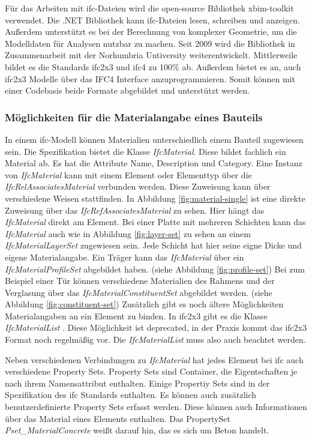 Für das Arbeiten mit \ac{ifc}-Dateien wird die open-source Bibliothek xbim-toolkit verwendet. Die .NET Bibliothek kann \ac{ifc}-Dateien lesen, schreiben und anzeigen. Außerdem unterstützt es bei der Berechnung von komplexer Geometrie, um die Modelldaten für Analysen nutzbar zu machen. Seit 2009 wird die Bibliothek in Zusammenarbeit mit der Norhumbria Untiversity weiterentwickelt. Mittlerweile bildet es die Standards \ac{ifc2x3} und \ac{ifc4} zu 100\% ab. Außerdem bietet es an, auch \ac{ifc2x3} Modelle über das IFC4 Interface anzuprogrammieren. Somit können mit einer Codebasis beide Formate abgebildet und unterstützt werden. \citep{Xbim_ltd_undated-wm}


\subsubsection{Möglichkeiten für die  Materialangabe eines Bauteils}
\label{s:basics:ifc:buildingmaterial}
In einem \ac{ifc}-Modell können Materialien unterschiedlich einem Bauteil zugewiesen sein. Die Spezifikation bietet die Klasse \textit{IfcMaterial}. Diese bildet fachlich ein Material ab. Es hat die Attribute Name, Description und Category.\citep{ifc_material} Eine Instanz von \textit{IfcMaterial} kann mit einem Element oder Elementtyp über die \textit{IfcRelAssociatesMaterial} verbunden werden. Diese Zuweisung kann über verschiedene Weisen stattfinden. In Abbildung \ref{fig:material-single} ist eine direkte Zuweisung über das \textit{IfcRefAssociatesMaterial} zu sehen. Hier hängt das \textit{IfcMaterial} direkt am Element. 
Bei einer Platte mit mehreren Schichten kann das \textit{IfcMaterial} auch wie in Abbildung \ref{fig:layer-set} zu sehen an einem \textit{IfcMaterialLayerSet} zugewiesen sein. Jede Schicht hat hier seine eigne Dicke und eigene Materialangabe. 
Ein Träger kann das \textit{IfcMaterial} über ein \textit{IfcMaterialProfileSet} abgebildet haben. (siehe Abbildung \ref{fig:profile-set})
Bei zum Beispiel einer Tür können verschiedene Materialien des Rahmens und der Verglasung über das \textit{IfcMaterialConstituentSet} abgebildet werden. (siehe Abbildung \ref{fig:constituent-set}) \citep{ifc_material_association}
Zusätzlich gibt es noch ältere Möglichkeiten Materialangaben an ein Element zu binden. In \ac{ifc2x3} gibt es die Klasse \textit{IfcMaterialList} \citep{Thomas2007_MaterialList}. Diese Möglichkeit ist deprecated, in der Praxis kommt das \ac{ifc2x3} Format noch regelmäßig vor. Die \textit{IfcMaterialList} muss also auch beachtet werden.

Neben verschiedenen Verbindungen zu \textit{IfcMaterial} hat jedes Element bei \ac{ifc} auch verschiedene Property Sets. Property Sets sind Container, die Eigentschaften je nach ihrem Namensattribut enthalten. Einige Propertiy Sets sind in der Spezifikation des \ac{ifc} Standards enthalten. Es können auch zusätzlich benutzerdefinierte Property Sets erfasst werden. Diese können auch Informationen über das Material eines Elements enthalten. \citep{ifc_property_set} Das PropertySet \textit{Pset\_MaterialConcrete} weißt darauf hin, das es sich um Beton handelt.

